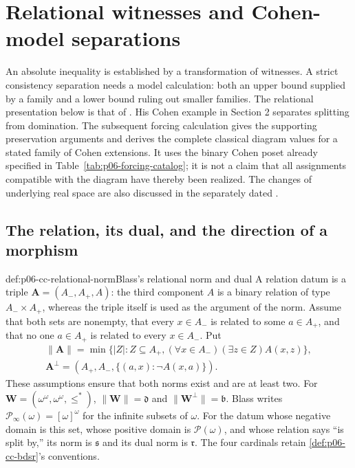 \section{Relational witnesses and Cohen-model separations}
\label{sec:p06-cardinal-characteristics-separations}

An absolute inequality is established by a transformation of witnesses.
A strict consistency separation needs a model calculation: both an upper
bound supplied by a family and a lower bound ruling out smaller families.
The relational presentation below is that of
\cite[\S\S2, 4, arXiv version 1]{BlassReductions1994V1}.
His Cohen example in Section 2 separates splitting from domination.
The subsequent forcing calculation gives the supporting preservation
arguments and derives the complete classical diagram values for a stated
family of Cohen extensions. It uses the binary Cohen poset already
specified in Table~\ref{tab:p06-forcing-catalog}; it is not a claim that
all assignments compatible with the diagram have thereby been realized.
The changes of underlying real space are also discussed in the separately
dated \cite[pp.~3--4, author draft of 24 November 2003]{BlassCombinatorialAuthor2003}.

\subsection{The relation, its dual, and the direction of a morphism}

\begin{hbdefinition}{def:p06-cc-relational-norm}{Blass's relational norm and dual}
A relation datum is a triple \(\mathbf A=(A_-,A_+,A)\): the third component
\(A\) is a binary relation of type \(A_-\times A_+\), whereas the
triple itself is used as the argument of the norm. Assume that both sets
are nonempty, that every \(x\in A_-\) is related to some \(a\in A_+\),
and that no one \(a\in A_+\) is related to every \(x\in A_-\). Put
\[
\begin{gathered}
 \|\mathbf A\|=\min\{|Z|:Z\subseteq A_+,
                  (\forall x\in A_-)(\exists z\in Z)A(x,z)\},
 \\
 \mathbf A^\perp=(A_+,A_-,\{(a,x):\neg A(x,a)\}).
\end{gathered}
\]
These assumptions ensure that both norms exist and are at least two.
For \(\mathbf W=(\omega^\omega,\omega^\omega,\leq^*)\),
\(\|\mathbf W\|=\mathfrak d\) and \(\|\mathbf W^\perp\|=\mathfrak b\).
Blass writes \(\mathcal P_\infty(\omega)=[\omega]^\omega\) for the
infinite subsets of \(\omega\). For the datum whose negative domain is this set, whose
positive domain is \(\mathcal P(\omega)\), and whose relation says
``is split by,'' its norm is \(\mathfrak s\) and its dual norm is
\(\mathfrak r\). The four cardinals retain
\cref{def:p06-cc-bdsr}'s conventions.
\end{hbdefinition}

